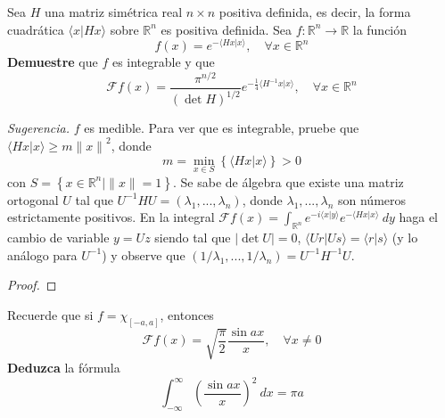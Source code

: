 \documentclass[12pt]{report}
\theoremstyle{largebreak}
\renewcommand{\geq}{\ensuremath{\geqslant}}
\newcommand\abs[1]{\ensuremath{\left|#1\right|}}
\newcommand\cf[3]{\ensuremath{#1:#2\rightarrow#3}}
\newcommand\norm[1]{\ensuremath{\|#1\|}}
\newcommand\pint[2]{\ensuremath{\langle#1| #2\rangle}}
\newcommand{\fou}[1]{\ensuremath{\mathcal{F}#1}}
\newcommand{\diag}[1]{\ensuremath{\left(#1\right)}}
\begin{document}
    \begin{excer}
        Sea $H$ una matriz simétrica real $n\times n$ positiva definida, es decir, la forma cuadrática $\pint{x}{Hx}$ sobre $\mathbb{R}^n$ es positiva definida. Sea $\cf{f}{\mathbb{R}^n}{\mathbb{R}}$ la función
        \begin{equation*}
            f(x)=e^{ -\pint{Hx}{x}},\quad\forall x\in\mathbb{R}^n
        \end{equation*}
        \textbf{Demuestre} que $f$ es integrable y que
        \begin{equation*}
            \fou{f}(x)=\frac{\pi^{ n/2}}{\left(\det H\right)^{ 1/2}}e^{ -\frac{1}{4}\pint{H^{-1}x}{x}},\quad\forall x\in\mathbb{R}^n
        \end{equation*}
        
        \textit{Sugerencia.} $f$ es medible. Para ver que es integrable, pruebe que $\pint{Hx}{x}\geq m\norm{x}^2$, donde
        \begin{equation*}
            m=\min_{ x\in S} \left\{\pint{Hx}{x} \right\}>0
        \end{equation*}
        con $S=\left\{x\in\mathbb{R}^n\Big|\norm{x}=1 \right\}$. Se sabe de álgebra que existe una matriz ortogonal $U$ tal que $U^{-1}HU=\diag{\lambda_1,...,\lambda_n}$, donde $\lambda_1,...,\lambda_n$ son números estrictamente positivos. En la integral $\fou{f}(x)=\int_{\mathbb{R}^n}e^{ -i\pint{x}{y}}e^{ -\pint{Hx}{x}}\:dy$ haga el cambio de variable $y=Uz$ siendo tal que $\abs{\det U}=0$, $\pint{Ur}{Us}=\pint{r}{s}$ (y lo análogo para $U^{-1}$) y observe que $\diag{1/\lambda_1,...,1/\lambda_n}=U^{-1}H^{-1}U$.
    \end{excer}

    \begin{proof}
        
    \end{proof}

    \begin{excer}
        Recuerde que si $f=\chi_{[-a,a]}$, entonces
        \begin{equation*}
            \fou{f}(x)=\sqrt{\frac{\pi}{2}}\frac{\sin ax}{x},\quad\forall x\neq0
        \end{equation*}
        \textbf{Deduzca} la fórmula
        \begin{equation*}
            \int_{ -\infty}^{\infty}\left(\frac{\sin ax}{x} \right)^2\:dx=\pi a
        \end{equation*}
    \end{excer}
\end{document}
